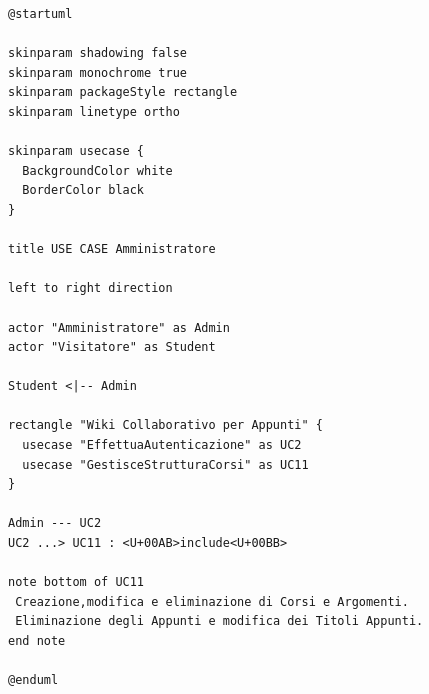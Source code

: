 \begin{verbatim}
@startuml

skinparam shadowing false
skinparam monochrome true
skinparam packageStyle rectangle
skinparam linetype ortho

skinparam usecase {
  BackgroundColor white
  BorderColor black
}

title USE CASE Amministratore

left to right direction

actor "Amministratore" as Admin
actor "Visitatore" as Student

Student <|-- Admin

rectangle "Wiki Collaborativo per Appunti" {
  usecase "EffettuaAutenticazione" as UC2
  usecase "GestisceStrutturaCorsi" as UC11
}

Admin --- UC2
UC2 ...> UC11 : <U+00AB>include<U+00BB>

note bottom of UC11
 Creazione,modifica e eliminazione di Corsi e Argomenti. 
 Eliminazione degli Appunti e modifica dei Titoli Appunti.
end note

@enduml
\end{verbatim}